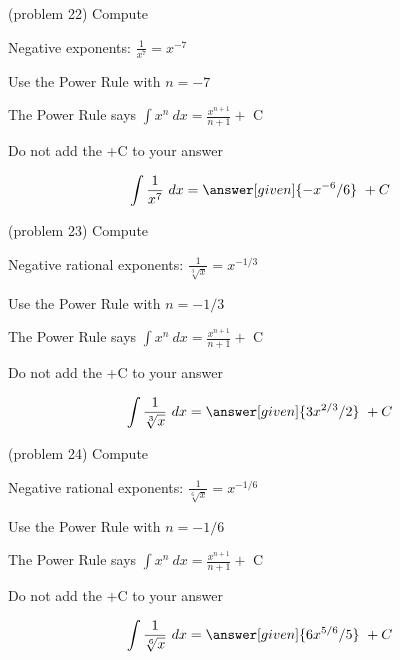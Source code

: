 \documentclass{ximera}
\begin{document}
\begin{problem}(problem 22)
Compute 

\begin{hint}
Negative exponents: $\frac{1}{x^7} = x^{-7}$
\end{hint}
\begin{hint}
Use the Power Rule with $n=-7$
\end{hint}
\begin{hint}
The Power Rule says $\int x^n \ dx = \frac{x^{n+1}}{n+1} +$ C
\end{hint}
\begin{hint}
\begin{center}
Do not add the +C to your answer
\end{center}
\end{hint}

\[
\int \frac{1}{x^7} \ dx =
\answer[given]{-x^{-6} /6} \ + C
\]
\end{problem}





\begin{problem}(problem 23)
Compute 

\begin{hint}
Negative rational exponents: $\frac{1}{\sqrt[3]x} = x^{-1/3}$
\end{hint}
\begin{hint}
Use the Power Rule with $n=-1/3$
\end{hint}
\begin{hint}
The Power Rule says $\int x^n \ dx = \frac{x^{n+1}}{n+1} +$ C
\end{hint}
\begin{hint}
\begin{center}
Do not add the +C to your answer
\end{center}
\end{hint}

\[
\int \frac{1}{\sqrt[3]x} \ dx =
\answer[given]{3x^{2/3} /2} \ + C
\]
\end{problem}



\begin{problem}(problem 24)
Compute 

\begin{hint}
Negative rational exponents: $\frac{1}{\sqrt[6]x} = x^{-1/6}$
\end{hint}
\begin{hint}
Use the Power Rule with $n=-1/6$
\end{hint}
\begin{hint}
The Power Rule says $\int x^n \ dx = \frac{x^{n+1}}{n+1} +$ C
\end{hint}
\begin{hint}
\begin{center}
Do not add the +C to your answer
\end{center}
\end{hint}

\[
\int \frac{1}{\sqrt[6]x} \ dx =
\answer[given]{6x^{5/6} /5} \ + C
\]
\end{problem}
\end{document}
